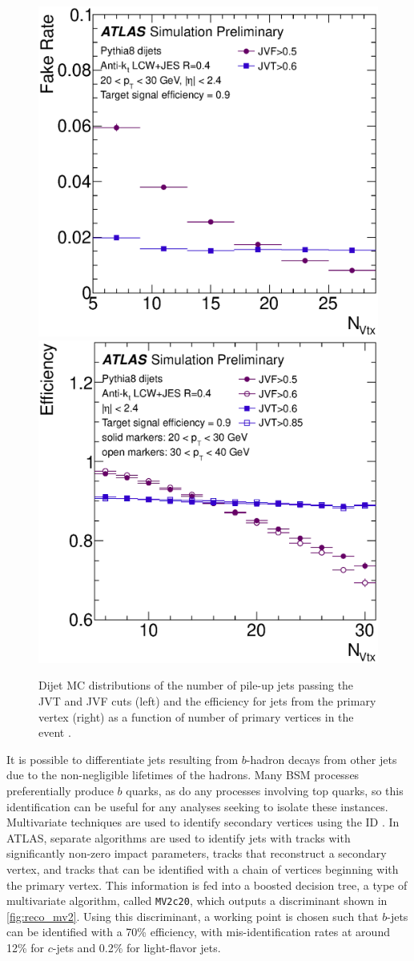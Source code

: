 \begin{centering}
\begin{figure}[!hbt]
\myfloatalign
\includegraphics[width=.48\linewidth]{figures/reco/jvt_fig_06b.eps}
\includegraphics[width=.48\linewidth]{figures/reco/jvt_fig_07a.eps}
\caption{ Dijet \ac{MC} distributions of the number of pile-up jets passing the \ac{JVT} and \ac{JVF} cuts (left) and the efficiency for jets from the primary vertex (right) as a function of number of primary vertices in the event \cite{ATLAS-CONF-2014-018}. }
\label{fig:reco_jvt}
\end{figure}
\end{centering}

It is possible to differentiate jets resulting from $b$-hadron decays from other jets due to the non-negligible lifetimes of the hadrons. Many \ac{BSM} processes preferentially produce $b$ quarks, as do any processes involving top quarks, so this identification can be useful for any analyses seeking to isolate these instances. Multivariate techniques are used to identify secondary vertices using the \ac{ID} \cite{ATL-PHYS-PUB-2015-022}. In \ac{ATLAS}, separate algorithms are used to identify jets with tracks with significantly non-zero impact parameters, tracks that reconstruct a secondary vertex, and tracks that can be identified with a chain of vertices beginning with the primary vertex. This information is fed into a boosted decision tree, a type of multivariate algorithm, called \texttt{MV2c20}, which outputs a discriminant shown in \autoref{fig:reco_mv2}. Using this discriminant, a working point is chosen such that $b$-jets can be identified with a 70\% efficiency, with mis-identification rates at around 12\% for $c$-jets and 0.2\% for light-flavor jets.

